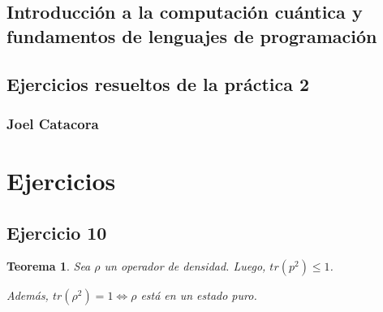 \documentclass[a4paper,11pt]{article}
\title{}
\author{}
\newtheorem*{theorem}{Teorema}
\begin{document}
\maketitle 

\thispagestyle{empty}
\begin{center}
\section*{Introducción a  la computación cuántica y fundamentos de lenguajes de programación} 
\subsection*{Ejercicios resueltos de la práctica 2}
\subsubsection*{Joel Catacora}

\end{center}

\newpage{\pagestyle{empty}\cleardoublepage}

\newpage

\section*
{Ejercicios}

\subsection*{Ejercicio 10}

\begin{theorem}
Sea $\rho$ un operador de densidad. Luego, $tr(p^2) \leq 1$.

Además, $tr(\rho^2) = 1 \Leftrightarrow \rho$ está en un estado puro.
\end{theorem}
\end{document}
